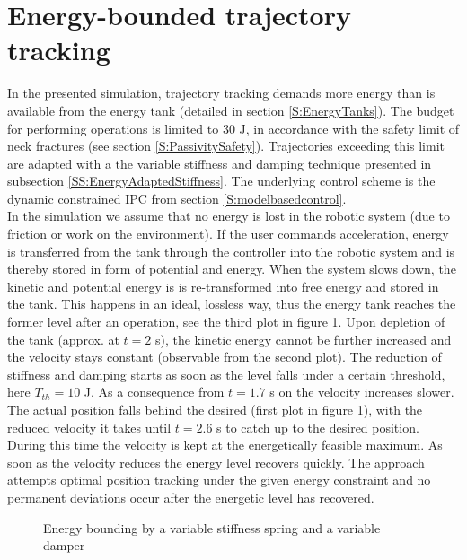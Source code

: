 \documentclass[a4paper,twoside, openright,12pt]{report}
\begin{document}
{\section{Energy-bounded trajectory tracking}
In the presented simulation, trajectory tracking demands more energy than is available from the energy tank (detailed in section \ref{S:EnergyTanks}). The budget for performing operations is limited to $30$ J, in accordance with the safety limit of neck fractures (see section \ref{S:PassivitySafety}). Trajectories exceeding this limit are adapted with a the variable stiffness and damping technique presented in subsection \ref{SS:EnergyAdaptedStiffness}. The underlying control scheme is the dynamic constrained IPC from section \ref{S:modelbasedcontrol}.\\
In the simulation we assume that no energy is lost in the robotic system (due to friction or work on the environment). If the user commands acceleration, energy is transferred from the tank through the controller into the robotic system and is thereby stored in form of potential and energy. When the system slows down, the kinetic and potential energy is is re-transformed into free energy and stored in the tank. This happens in an ideal, lossless way, thus the energy tank reaches the former level after an operation, see the third plot in figure \ref{FIG:VarStiff}. Upon depletion of the tank (approx. at $t=2$ s), the kinetic energy cannot be further increased  and the velocity stays constant (observable from the second plot). The reduction of stiffness and damping starts as soon as the level falls under a certain threshold, here $T_{th}=10$ J. As a consequence from $t=1.7$ s on the velocity increases slower. The actual position falls behind the desired (first plot in figure \ref{FIG:VarStiff}), with the reduced velocity it takes until $t=2.6$ s to catch up to the desired position. During this time the velocity is kept at the energetically feasible maximum. As soon as the velocity reduces the energy level recovers quickly. The approach attempts optimal position tracking under the given energy constraint and no permanent deviations occur after the energetic level has recovered.
\begin{figure}

\label{FIG:VarStiff}
\caption[Simulation results of the energy bounding by a variable stiffness spring]{Energy bounding by a variable stiffness spring and a variable damper}
\end{figure}
}
\end{document}
